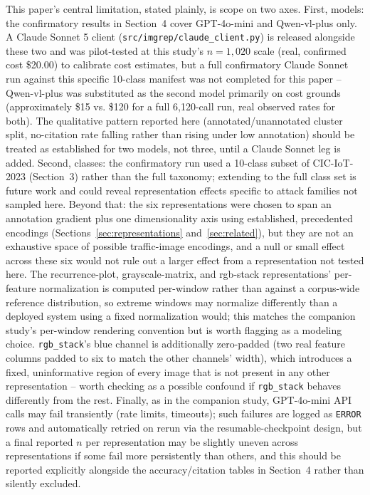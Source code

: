 \documentclass[twocolumn]{svjour3}
\begin{document}
This paper's central limitation, stated plainly, is scope on two axes. First, models: the
confirmatory results in Section~4 cover GPT-4o-mini and Qwen-vl-plus only. A Claude
Sonnet 5 client (\texttt{src/imgrep/claude\_client.py}) is released alongside these two and was
pilot-tested at this study's $n=1{,}020$ scale (real, confirmed cost \$20.00) to calibrate cost
estimates, but a full confirmatory Claude Sonnet run against this specific 10-class manifest was not
completed for this paper -- Qwen-vl-plus was substituted as the second model primarily on cost
grounds (approximately \$15 vs. \$120 for a full 6,120-call run, real observed rates for both). The
qualitative pattern reported here (annotated/unannotated cluster split, no-citation rate falling
rather than rising under low annotation) should be treated as established for two models, not three,
until a Claude Sonnet leg is added. Second, classes: the confirmatory run used a 10-class subset of
CIC-IoT-2023 (Section~3) rather than the full taxonomy; extending to the full class
set is future work and could reveal representation effects specific to attack families not sampled
here. Beyond that: the six representations were chosen to span an annotation
gradient plus one dimensionality axis using established, precedented encodings
(Sections~\ref{sec:representations} and~\ref{sec:related}), but they are not an exhaustive space of
possible traffic-image encodings, and a null or small effect across these six would not rule out a
larger effect from a representation not tested here. The recurrence-plot, grayscale-matrix, and
rgb-stack representations' per-feature normalization is computed per-window rather than against a
corpus-wide reference distribution, so extreme windows may normalize differently than a deployed
system using a fixed normalization would; this matches the companion study's per-window rendering
convention but is worth flagging as a modeling choice. \texttt{rgb\_stack}'s blue channel is
additionally zero-padded (two real feature columns padded to six to match the other channels'
width), which introduces a fixed, uninformative region of every image that is not present in any
other representation -- worth checking as a possible confound if \texttt{rgb\_stack} behaves
differently from the rest. Finally, as in the companion study, GPT-4o-mini API calls may fail transiently
(rate limits, timeouts); such failures are logged as \texttt{ERROR} rows and automatically retried on
rerun via the resumable-checkpoint design, but a final reported $n$ per representation may be
slightly uneven across representations if some fail more persistently than others, and this should
be reported explicitly alongside the accuracy/citation tables in Section~4 rather
than silently excluded.
\end{document}
